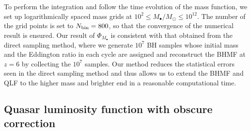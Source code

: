 \documentclass[twocolumn, twocolappendix]{aastex63}
\newcommand{\Msun}{M_\odot}
\newcommand{\Mbh}{M_\bullet}
\begin{document}
\begin{CJK*}{UTF8}{gbsn}
To perform the integration and follow the time evolution of the mass function, we set up 
logarithmically spaced mass grids at $10^2 \leq \Mbh /\Msun \leq 10^{12}$.
The number of the grid points is set to $N_{\rm bin}=800$, so that the convergence of the numerical result is ensured.
%
Our result of $\Phi_{\Mbh}$ is consistent with that obtained from the direct sampling method, where 
we generate $10^7$ BH samples whose initial mass and the Eddington ratio in each cycle are assigned
and reconstruct the BHMF at $z=6$ by collecting the $10^7$ samples.
Our method reduces the statistical errors seen in the direct sampling method 
and thus allows us to extend the BHMF and QLF to the higher mass and brighter end
in a reasonable computational time.







\vspace{2mm}
\subsection{Quasar luminosity function with obscure correction}\label{sec:LF}


\end{CJK*}
\end{document}
